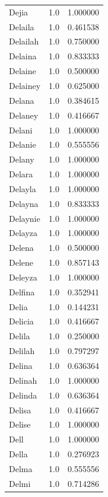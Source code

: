 \documentclass[
  letterpaper,
  DIV=11,
  numbers=noendperiod]{scrreprt}
\begin{document}
\begin{tabular}{lrr}
Dejia           &   1.0 &   1.000000 \\
Delaila         &   1.0 &   0.461538 \\
Delailah        &   1.0 &   0.750000 \\
Delaina         &   1.0 &   0.833333 \\
Delaine         &   1.0 &   0.500000 \\
Delainey        &   1.0 &   0.625000 \\
Delana          &   1.0 &   0.384615 \\
Delaney         &   1.0 &   0.416667 \\
Delani          &   1.0 &   1.000000 \\
Delanie         &   1.0 &   0.555556 \\
Delany          &   1.0 &   1.000000 \\
Delara          &   1.0 &   1.000000 \\
Delayla         &   1.0 &   1.000000 \\
Delayna         &   1.0 &   0.833333 \\
Delaynie        &   1.0 &   1.000000 \\
Delayza         &   1.0 &   1.000000 \\
Delena          &   1.0 &   0.500000 \\
Delene          &   1.0 &   0.857143 \\
Deleyza         &   1.0 &   1.000000 \\
Delfina         &   1.0 &   0.352941 \\
Delia           &   1.0 &   0.144231 \\
Delicia         &   1.0 &   0.416667 \\
Delila          &   1.0 &   0.250000 \\
Delilah         &   1.0 &   0.797297 \\
Delina          &   1.0 &   0.636364 \\
Delinah         &   1.0 &   1.000000 \\
Delinda         &   1.0 &   0.636364 \\
Delisa          &   1.0 &   0.416667 \\
Delise          &   1.0 &   1.000000 \\
Dell            &   1.0 &   1.000000 \\
Della           &   1.0 &   0.276923 \\
Delma           &   1.0 &   0.555556 \\
Delmi           &   1.0 &   0.714286 \\

\end{tabular}
\end{document}
